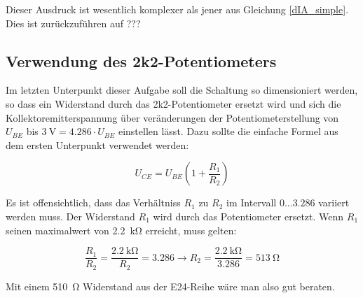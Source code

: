 Dieser Ausdruck ist wesentlich komplexer als jener aus Gleichung \ref{dIA_simple}. Dies ist zurückzuführen auf ???

\subsection{Verwendung des 2k2-Potentiometers}

Im letzten Unterpunkt dieser Aufgabe soll die Schaltung so dimensioniert werden, so dass ein Widerstand durch das 2k2-Potentiometer ersetzt wird und sich die Kollektoremitterspannung über veränderungen der Potentiometerstellung von $U_{BE}$ bis $\SI{3}{\volt}=4.286 \cdot U_{BE}$ einstellen lässt. Dazu sollte die einfache Formel aus dem ersten Unterpunkt verwendet werden:

\begin{equation*}
     U_{CE} = U_{BE} \left( 1 + \frac{R_1}{R_2} \right)
\end{equation*}

Es ist offensichtlich, dass das Verhältniss $R_1$ zu $R_2$ im Intervall $0 \ldots 3.286$ variiert werden muss. Der Widerstand $R_1$ wird durch das Potentiometer ersetzt. Wenn $R_1$ seinen maximalwert von \SI{2.2}{\kilo \ohm} erreicht, muss gelten:

\begin{equation*}
    \frac{R_1}{R_2} = \frac{\SI{2.2}{\kilo \ohm}}{R_2} = 3.286 \rightarrow R_2 = \frac{\SI{2.2}{\kilo \ohm}}{3.286} = \SI{513}{\ohm}
\end{equation*}

Mit einem \SI{510}{\ohm} Widerstand aus der E24-Reihe wäre man also gut beraten.
